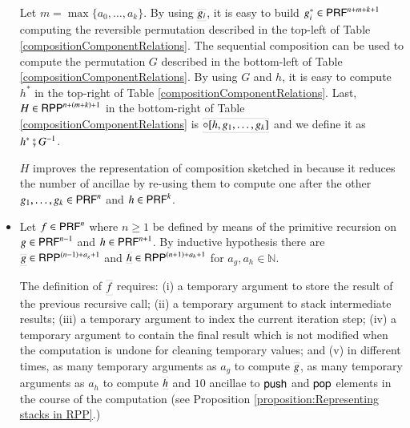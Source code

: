 \begin{prf}
\begin{itemize}[leftmargin=5mm]
 Let $m=\max\{ a_0,\ldots,a_k\}$.
By using $\prrpr{g_i}$, it is easy to build $g_i^{*}\in \mathsf{P}\mathsf{RF}^{n+m+k+1}$ computing 
the reversible permutation described in the top-left of Table \ref{compositionComponentRelations}.
The sequential composition can be used to compute  the permutation $G$ described in the bottom-left of Table \ref{compositionComponentRelations}.
By using $G$ and $h$, it is easy to compute $h^*$ in the top-right of Table \ref{compositionComponentRelations}.
Last, $H\in\mathsf{RPP}^{n+(m+k)+1}$ in the bottom-right of Table \ref{compositionComponentRelations} is 
 $\prrpr{\prCom{h,g_1,\ldots,g_k}}$ and we define it as $h^* \fatsemi {G}^{-1}$.

$H$ improves the representation of composition sketched  in \cite{PaoliniPiccoloRoversiICTCS2015} because
it reduces the number of ancillae by re-using them to compute one after the other $ g_1,\ldots,g_k\in\mathsf{P}\mathsf{RF}^{n} $ and $ h\in\mathsf{P}\mathsf{RF}^{k} $.

\item 
Let $f\in\mathsf{P}\mathsf{RF}^{n}$ where $n\geq 1$ be defined by means of the primitive recursion on $ g\in\mathsf{P}\mathsf{RF}^{n-1} $ and $ h\in\mathsf{P}\mathsf{RF}^{n+1} $.
By inductive hypothesis there are $ \prrpr{g} \in \RPP^{(n-1)+a_g+1}$ and $ \prrpr{h}\in\RPP^{(n+1)+a_h+1} $ for 
$ a_g,a_h\in\mathbb{N}$.

The definition of $\prrpr{f}$ requires:
(i) a temporary argument to store the result of the previous recursive call;
(ii) a temporary argument  to stack  intermediate results;
(iii) a temporary argument  to index the current iteration step;
(iv) a temporary argument to contain the final result which is not modified when the computation is undone for cleaning temporary values; and
(v) in different times, as many temporary arguments as $a_g$ to compute $\prrpr{g}$, 
                        as many temporary arguments as $a_h$ to compute $\prrpr{h}$ and
                        $ 10 $ 
                        ancillae to $\mathsf{push}$ and $\mathsf{pop}$ elements in the course of the computation
                        (see Proposition \ref{proposition:Representing stacks in RPP}.)



\end{itemize}
\end{prf}
